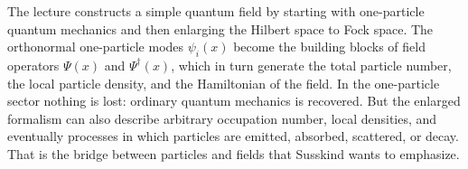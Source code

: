 The lecture constructs a simple quantum field by starting with one-particle quantum mechanics and then enlarging the Hilbert space to Fock space. The orthonormal one-particle modes $\psi_i(x)$ become the building blocks of field operators $\Psi(x)$ and $\Psi^\dagger(x)$, which in turn generate the total particle number, the local particle density, and the Hamiltonian of the field. In the one-particle sector nothing is lost: ordinary quantum mechanics is recovered. But the enlarged formalism can also describe arbitrary occupation number, local densities, and eventually processes in which particles are emitted, absorbed, scattered, or decay. That is the bridge between particles and fields that Susskind wants to emphasize.